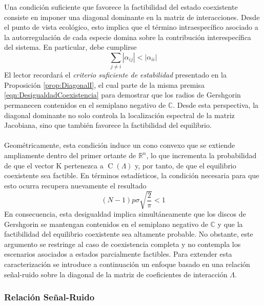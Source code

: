Una condición suficiente que favorece la factibilidad del estado coexistente consiste en imponer una diagonal dominante en la matriz de interacciones. Desde el punto de vista ecológico, esto implica que el término intraespecífico asociado a la autorregulación de cada especie domina sobre la contribución interespecífica del sistema. En particular, debe cumplirse
$$\sum_{j\neq i}|\alpha_{ij}|<|\alpha_{ii}|$$
El lector recordará el \textit{criterio suficiente de estabilidad} presentado en la Proposición \ref{prop:DiagonalI}, el cual parte de la misma premisa \eqref{eqn:DesigualdadCoexistencia} para demostrar que los radios de Gershgorin permanecen contenidos en el semiplano negativo de $\mathbb{C}$. Desde esta perspectiva, la diagonal dominante no solo controla la localización espectral de la matriz Jacobiana, sino que también favorece la factibilidad del equilibrio.\\
\\
Geométricamente, esta condición induce un cono convexo que se extiende ampliamente dentro del primer ortante de $\mathbb{R}^n$, lo que incrementa la probabilidad de que el vector $\mathrm{K}$ pertenezca a $\operatorname{C}(\Lambda)$ y, por tanto, de que el equilibrio coexistente sea factible. En términos estadísticos, la condición necesaria para que esto ocurra recupera nuevamente el resultado
$$(N-1)p\sigma\sqrt{\frac{2}{\pi}}<1$$
En consecuencia, esta desigualdad implica simultáneamente que los discos de Gershgorin se mantengan contenidos en el semiplano negativo de $\mathbb{C}$ y que la factibilidad del equilibrio coexistente sea altamente probable. No obstante, este argumento se restringe al caso de coexistencia completa y no contempla los escenarios asociados a estados parcialmente factibles. Para extender esta caracterización se introduce a continuación un enfoque basado en una relación señal-ruido sobre la diagonal de la matriz de coeficientes de interacción $\Lambda$.

\subsubsection*{Relación Señal-Ruido}

